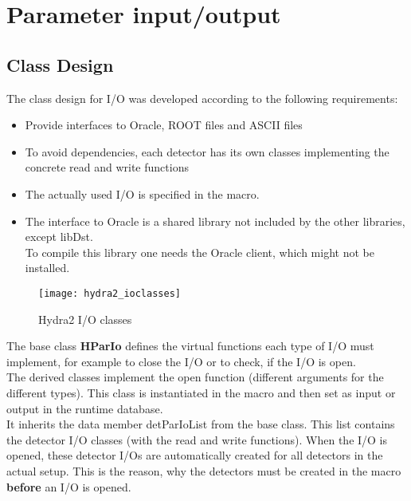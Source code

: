 \section[Parameter input/output]{Parameter input/output} \label{sec:rtdbParameterIo}

\subsection[Class Design]{Class Design}

The class design for I/O was developed according to the following requirements:
\begin{itemize}
 \item Provide interfaces to Oracle, ROOT files and ASCII files
 \item To avoid dependencies, each detector has its own classes implementing the concrete read and write functions
 \item The actually used I/O is specified in the macro.
 \item The interface to Oracle is a shared library not included by the other libraries, except libDst.\\
   To compile this library one needs the Oracle client, which might not be installed.
\end{itemize}

\begin{figure}[\htb]
  \centering
  \texttt{[image: hydra2\_ioclasses]}
  \caption[Hydra2 I/O classes]{Hydra2 I/O classes} \label{fig:paramInitHydra2IoClasses}
\end{figure}

The base class \textbf{HParIo} defines the virtual functions each type of I/O must implement, for example to close the I/O 
or to check, if the I/O is open.\\

The derived classes implement the open function (different arguments for the different types). This class is instantiated 
in the macro and then set as input or output in the runtime database.\\
It inherits the data member detParIoList from the base class. This list contains the detector I/O classes (with the read 
and write functions). When the I/O is opened, these detector I/Os are automatically created for all detectors in the actual 
setup. This is the reason, why the detectors must be created in the macro \textbf{before} an I/O is opened.\\


